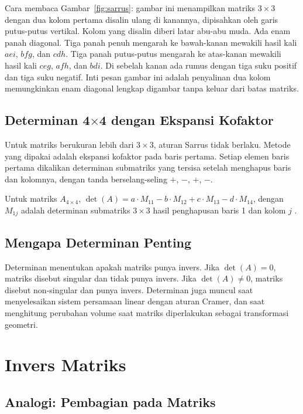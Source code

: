 \documentclass[11pt,a4paper]{article}
\begin{document}
Cara membaca Gambar~\ref{fig:sarrus}: gambar ini menampilkan matriks $3 \times 3$ dengan dua kolom pertama disalin ulang di kanannya, dipisahkan oleh garis putus-putus vertikal. Kolom yang disalin diberi latar abu-abu muda. Ada enam panah diagonal. Tiga panah penuh mengarah ke bawah-kanan mewakili hasil kali $aei$, $bfg$, dan $cdh$. Tiga panah putus-putus mengarah ke atas-kanan mewakili hasil kali $ceg$, $afh$, dan $bdi$. Di sebelah kanan ada rumus dengan tiga suku positif dan tiga suku negatif. Inti pesan gambar ini adalah penyalinan dua kolom memungkinkan enam diagonal lengkap digambar tanpa keluar dari batas matriks.

\subsection{Determinan 4$\times$4 dengan Ekspansi Kofaktor}

Untuk matriks berukuran lebih dari $3 \times 3$, aturan Sarrus tidak berlaku. Metode yang dipakai adalah ekspansi kofaktor pada baris pertama. Setiap elemen baris pertama dikalikan determinan submatriks yang tersisa setelah menghapus baris dan kolomnya, dengan tanda berselang-seling $+$, $-$, $+$, $-$.

Untuk matriks $A_{4 \times 4}$, $\det(A)=a \cdot M_{11}-b \cdot M_{12}+c \cdot M_{13}-d \cdot M_{14}$, dengan $M_{1j}$ adalah determinan submatriks $3\times 3$ hasil penghapusan baris 1 dan kolom $j$ \cite{anton}.

\subsection{Mengapa Determinan Penting}

Determinan menentukan apakah matriks punya invers. Jika $\det(A)=0$, matriks disebut singular dan tidak punya invers. Jika $\det(A) \ne 0$, matriks disebut non-singular dan punya invers. Determinan juga muncul saat menyelesaikan sistem persamaan linear dengan aturan Cramer, dan saat menghitung perubahan volume saat matriks diperlakukan sebagai transformasi geometri.

\section{Invers Matriks}

\subsection{Analogi: Pembagian pada Matriks}
\end{document}
